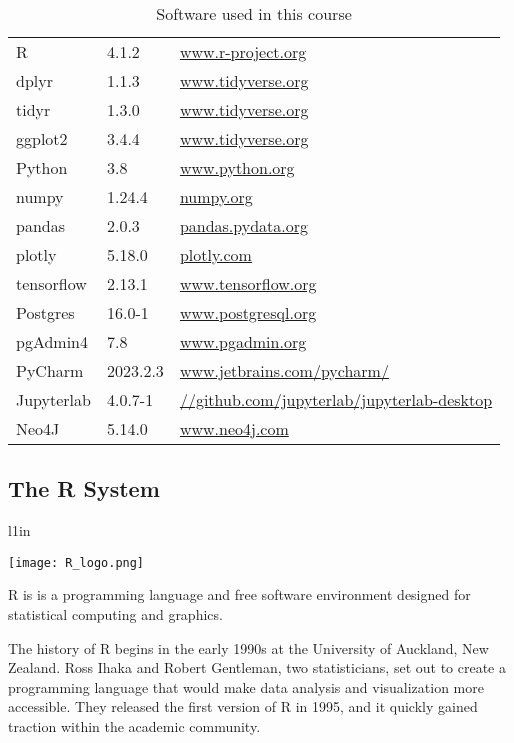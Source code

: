 \begin{table}
\small
\centering

\begin{tabular}{l|l|l} \hline
R & 4.1.2 & \url{www.r-project.org}\\ 
dplyr & 1.1.3 & \url{www.tidyverse.org} \\
tidyr & 1.3.0 & \url{www.tidyverse.org} \\
ggplot2 & 3.4.4 & \url{www.tidyverse.org} \\
Python & 3.8 & \url{www.python.org} \\
numpy & 1.24.4 & \url{numpy.org} \\
pandas & 2.0.3 & \url{pandas.pydata.org} \\
plotly & 5.18.0 & \url{plotly.com} \\ 
tensorflow & 2.13.1 & \url{www.tensorflow.org} \\
Postgres & 16.0-1 & \url{www.postgresql.org} \\
pgAdmin4 & 7.8 & \url{www.pgadmin.org} \\
PyCharm & 2023.2.3 & \url{www.jetbrains.com/pycharm/} \\
Jupyterlab & 4.0.7-1 & \url{//github.com/jupyterlab/jupyterlab-desktop} \\
Neo4J & 5.14.0 & \url{www.neo4j.com} \\ \hline
\end{tabular}
\caption[Software used in this book]{Software used in this course}
\label{tab:software}
\end{table}

\subsection*{The R System}

\begin{wrapfigure}{l}{1in}
\begin{center}
\texttt{[image: R\_logo.png]}
\end{center}
\end{wrapfigure}
R is is a programming language and free software environment designed for statistical computing and graphics. 

The history of R begins in the early 1990s at the University of Auckland, New Zealand. Ross Ihaka and Robert Gentleman, two statisticians, set out to create a programming language that would make data analysis and visualization more accessible. They released the first version of R in 1995, and it quickly gained traction within the academic community.

